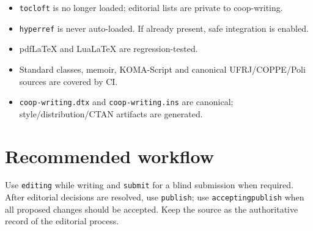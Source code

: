 \documentclass[11pt]{article}
\newcommand{\opt}[1]{\texttt{#1}}
\begin{document}
\begin{itemize}
\item \texttt{tocloft} is no longer loaded; editorial lists are private to coop-writing.
\item \texttt{hyperref} is never auto-loaded. If already present, safe integration is enabled.
\item pdfLaTeX and LuaLaTeX are regression-tested.
\item Standard classes, memoir, KOMA-Script and canonical UFRJ/COPPE/Poli sources are covered by CI.
\item \texttt{coop-writing.dtx} and \texttt{coop-writing.ins} are canonical; style/distribution/CTAN artifacts are generated.
\end{itemize}

\section*{Recommended workflow}

Use \opt{editing} while writing and \opt{submit} for a blind submission when required. After editorial decisions are resolved, use \opt{publish}; use \opt{acceptingpublish} when all proposed changes should be accepted. Keep the source as the authoritative record of the editorial process.
\end{document}
